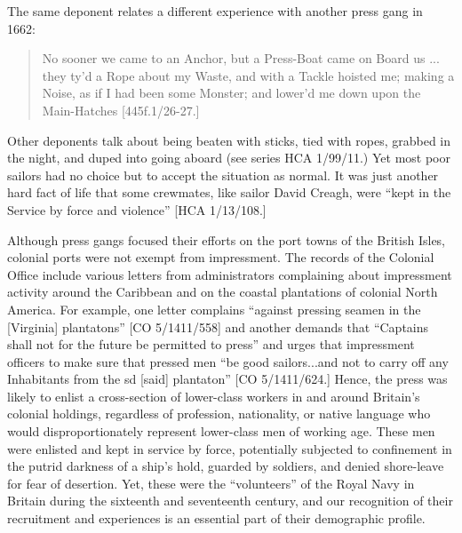 The same deponent relates a different experience with another press gang in 1662:

\begin{quotation}
No sooner we came to an Anchor, but a Press-Boat came on Board us ... they ty’d a Rope about my Waste, and with a Tackle hoisted me; making a Noise, as if I had been some Monster; and lower’d me down upon the Main-Hatches [445f.1/26-27.]\end{quotation}

Other deponents talk about being beaten with sticks, tied with ropes, grabbed in the night, and duped into going aboard (see series HCA 1/99/11.) Yet most poor sailors had no choice but to accept the situation as normal. It was just another hard fact of life that some crewmates, like sailor David Creagh, were “kept in the Service by force and violence” [HCA 1/13/108.] 

  Although press gangs focused their efforts on the port towns of the British Isles, colonial ports were not exempt from impressment. The records of the Colonial Office include various letters from administrators complaining about impressment activity around the Caribbean and on the coastal plantations of colonial North America. For example, one letter complains “against pressing seamen in the [Virginia] plantatons” [CO 5/1411/558] and another demands that “Captains shall not for the future be permitted to press” and urges that impressment officers to make sure that pressed men “be good sailors...and not to carry off any Inhabitants from the sd [said] plantaton” [CO 5/1411/624.] Hence, the press was likely to enlist a cross-section of lower-class workers in and around Britain’s colonial holdings, regardless of profession, nationality, or native language who would disproportionately represent lower-class men of working age. These men were enlisted and kept in service by force, potentially subjected to confinement in the putrid darkness of a ship’s hold, guarded by soldiers, and denied shore-leave for fear of desertion. Yet, these were the “volunteers” of the Royal Navy in Britain during the sixteenth and seventeenth century, and our recognition of their recruitment and experiences is an essential part of their demographic profile.  

